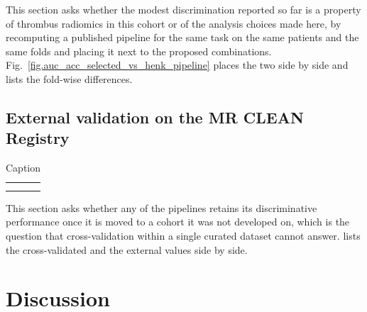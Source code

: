 \documentclass[preprint,12pt]{elsarticle}
\begin{document}
This section asks whether the modest discrimination reported so far is a property of thrombus radiomics in this cohort or of the analysis choices made here, by recomputing a published pipeline for the same task on the same patients and the same folds and placing it next to the proposed combinations. Fig.~\ref{fig.auc_acc_selected_vs_henk_pipeline} places the two side by side and  lists the fold-wise differences.






\subsection{External validation on the MR CLEAN Registry}

\label{sec:results:external}
\begin{table}[]
    \centering
    \begin{tabular}{c|c}
         &  \\
         & 
    \end{tabular}
    \caption{Caption}
    \label{tab:placeholder}
\end{table}



This section asks whether any of the pipelines retains its discriminative performance once it is moved to a cohort it was not developed on, which is the question that cross-validation within a single curated dataset cannot answer.  lists the cross-validated and the external values side by side.








\section{Discussion}
\end{document}
